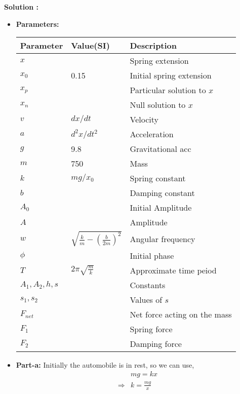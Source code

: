 \documentclass[journal,12pt,twocolumn]{IEEEtran}
\theoremstyle{remark}
\begin{document}
\textbf{Solution :}
\begin{itemize}
\item \textbf{Parameters:}
    \begin{table}[h]
\begin{tabular}{|l|l|l|}
\hline
\textbf{Parameter} & \textbf{Value(SI)} & \textbf{Description} \\ \hline
$x$          & & Spring extension  \\ \hline
$x_{0}$ & 0.15 & Initial spring extension \\ \hline
$x_{p}$ & & Particular solution to $x$ \\ \hline
$x_{n}$ & & Null solution to $x$ \\ \hline
$v$          & $dx/dt$ & Velocity          \\ \hline
$a$          & $d^2x/dt^2$ & Acceleration      \\ \hline
$g$          & 9.8 & Gravitational acc \\ \hline
$m$          & 750 & Mass              \\ \hline
$k$          & $mg/x_{0}$ & Spring constant   \\ \hline
$b$          &  & Damping constant  \\ \hline
$A_{0}$               & & Initial Amplitude  \\ \hline
$A$                   & & Amplitude  \\ \hline
$w$ & $\sqrt{\frac{k}{m}-\left(\frac{b}{2m}\right)^2}$ & Angular frequency \\ \hline
$\phi$ & & Initial phase \\ \hline
$T$ & $2\pi\sqrt{\frac{m}{k}}$ & Approximate time peiod \\ \hline
$A_{1}, A_{2},h,s$ & & Constants \\ \hline
$s_{1},s_{2}$ & & Values of $s$ \\ \hline
$F_{net}$ & & Net force acting on the mass \\ \hline
$F_{1}$ & & Spring force \\ \hline
$F_{2}$ & & Damping force\\ \hline
\end{tabular}
\end{table}




\item\textbf{Part-a:}
    Initially the automobile is in rest, so we can use,
    \begin{align}
&mg = kx \\
\Rightarrow &k=\frac{mg}{x}
    \end{align}


\end{itemize}
\end{document}
